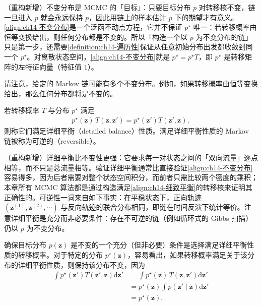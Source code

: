 \documentclass[../../main.tex]{subfiles}
\begin{document}
\begin{remark}（重构新增）不变分布是 MCMC 的「目标」：只要目标分布 $p$ 对转移核不变，链一旦进入 $p$ 就会永远保持 $p$，因此用链上的样本估计 $p$ 下的期望才有意义。\eqref{align:ch14-不变分布}是一个泛函不动点方程，它并不保证 $p^{\star}$ 唯一：若转移概率由恒等变换给出，则任何分布都是不变的。所以「构造一个以 $p$ 为不变分布的链」只是第一步，还需要\cref{definition:ch14-遍历性}保证从任意初始分布出发都收敛到同一个 $p^{\star}$。对离散状态空间，\eqref{align:ch14-不变分布}就是 $p^{\star}=p^{\star}T$，即 $p^{\star}$ 是转移矩阵的左特征向量（特征值 $1$）。
\end{remark}

请注意，给定的 Markov 链可能有多个不变分布。例如，如果转移概率由恒等变换给出，那么任何分布都将是不变的。

\begin{definition}[详细平衡]\label{definition:ch14-详细平衡}
若转移概率 $T$ 与分布 $p^{\star}$ 满足
\begin{align}
p^{\star}(\bm{z})\,T\!\left(\bm{z},\bm{z}'\right)=p^{\star}\!\left(\bm{z}'\right)T\!\left(\bm{z}',\bm{z}\right),
\label{align:ch14-细致平衡}
\end{align}
则称它们满足详细平衡（detailed balance）性质。满足详细平衡性质的 Markov 链被称为可逆的（reversible）。
\end{definition}

\begin{remark}（重构新增）详细平衡比不变性更强：它要求每一对状态之间的「双向流量」逐点相等，而不只是总流量相等。验证详细平衡通常比直接验证\eqref{align:ch14-不变分布}容易得多，因为后者需要对整个状态空间积分，而前者只需比较两个密度的乘积；本章所有 MCMC 算法都是通过构造满足\eqref{align:ch14-细致平衡}的转移核来证明其正确性的。可逆性一词来自如下事实：在平稳状态下，正向轨迹 $\left(\bm{z}^{(1)},\bm{z}^{(2)},\cdots\right)$ 与反向轨迹的联合分布相同，即链在时间反演下统计等价。注意详细平衡是充分而非必要条件：存在不可逆的链（例如循环式的 Gibbs 扫描）仍以 $p$ 为不变分布。
\end{remark}

确保目标分布 $p(\bm{z})$ 是不变的一个充分（但非必要）条件是选择满足详细平衡性质的转移概率。对于特定的分布 $p^{\star}(\bm{z})$，容易看出，如果转移概率满足关于该分布的详细平衡性质，则保持该分布不变，因为
\begin{align}
\int p^{\star}\!\left(\bm{z}'\right)T\!\left(\bm{z}',\bm{z}\right)\mathrm{d}\bm{z}'&=\int p^{\star}(\bm{z})\,T\!\left(\bm{z},\bm{z}'\right)\mathrm{d}\bm{z}'\nonumber\\
&=p^{\star}(\bm{z})\int p\!\left(\bm{z}'\mid\bm{z}\right)\mathrm{d}\bm{z}'\nonumber\\
&=p^{\star}(\bm{z}).
\label{align:ch14-细致平衡推导}
\end{align}
\end{document}
